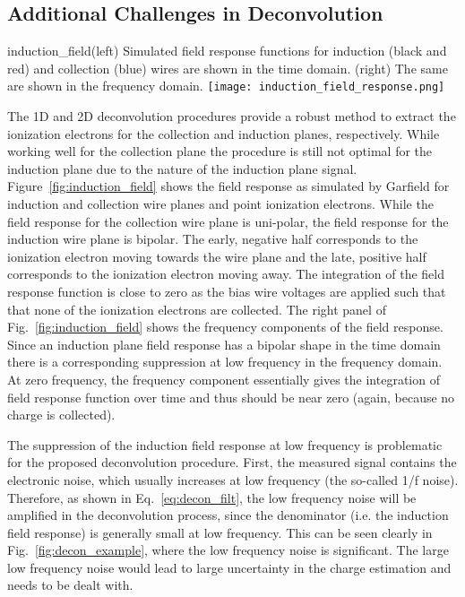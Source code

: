 \subsection{Additional Challenges in Deconvolution}

\begin{cdrfigure}{induction_field}{(left) Simulated field response functions for induction (black and red) and 
collection (blue) wires are shown in the time domain. (right) The same are shown in 
the frequency domain.}
\texttt{[image: induction\_field\_response.png]}
\end{cdrfigure}


The 1D and 2D deconvolution procedures provide a robust method to extract the ionization
electrons for the collection and induction planes, respectively. 
%
While working well for the collection plane the procedure is still not optimal 
for the induction plane due to the nature of the induction plane signal. 
Figure~\ref{fig:induction_field} shows the field response as simulated by Garfield 
for induction and collection wire planes and point ionization
electrons. While the field response for the collection wire plane is uni-polar, the field 
response for the induction wire plane is bipolar. 
%
The early, negative half corresponds to the ionization electron moving
towards the wire plane and the late, positive half corresponds
to the ionization electron moving away.
%
The integration of the field response function is close to zero
as the bias wire voltages are applied such that that none of the ionization electrons are
collected. The right panel of Fig.~\ref{fig:induction_field} shows the 
frequency components of the field response. 
%
Since an induction plane field response has a bipolar shape in the time domain 
there is a corresponding suppression at low frequency in the frequency 
domain. At zero frequency, the frequency component essentially gives the 
integration of field response function over time and thus should be near 
zero (again, because no charge is collected).


The suppression of the induction field response at low frequency is problematic for the
proposed deconvolution procedure. First,  the measured signal contains the electronic noise, 
which usually increases at low frequency (the so-called 1/f noise). Therefore, as shown in 
Eq.~\eqref{eq:decon_filt}, the low frequency noise will be amplified in the deconvolution 
process, since the denominator (i.e. the induction field response) is generally small at 
low frequency. This can be seen clearly in Fig.~\ref{fig:decon_example}, where the low frequency noise
is significant. The large low frequency noise would lead to large uncertainty 
in the charge estimation and needs to be dealt with.  

